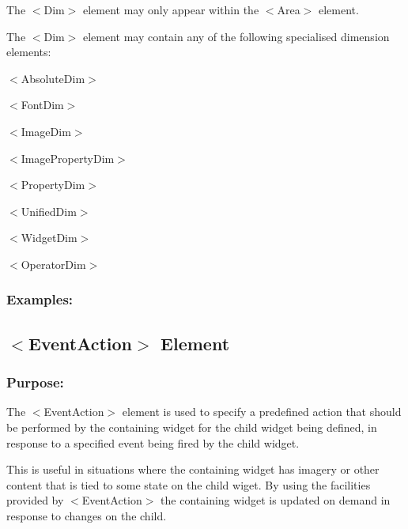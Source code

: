 \begin{DoxyItemize}
\item The {\ttfamily $<$Dim$>$} element may only appear within the {\ttfamily $<$Area$>$} element.


\item The {\ttfamily $<$Dim$>$} element may contain any of the following specialised dimension elements\+: 
\begin{DoxyItemize}
\item {\ttfamily $<$Absolute\+Dim$>$} 
\item {\ttfamily $<$Font\+Dim$>$} 
\item {\ttfamily $<$Image\+Dim$>$} 
\item {\ttfamily $<$Image\+Property\+Dim$>$} 
\item {\ttfamily $<$Property\+Dim$>$} 
\item {\ttfamily $<$Unified\+Dim$>$} 
\item {\ttfamily $<$Widget\+Dim$>$} 
\item {\ttfamily $<$Operator\+Dim$>$} 
\end{DoxyItemize}
\end{DoxyItemize}\hypertarget{fal_element_ref_fal_elem_ref_sec_9_4}{}\subsubsection{Examples\+:}\label{fal_element_ref_fal_elem_ref_sec_9_4}
\hypertarget{fal_element_ref_fal_elem_ref_eventaction}{}\subsection{$<$\+Event\+Action$>$ Element}\label{fal_element_ref_fal_elem_ref_eventaction}
\hypertarget{fal_element_ref_fal_elem_ref_eventaction_1}{}\subsubsection{Purpose\+:}\label{fal_element_ref_fal_elem_ref_eventaction_1}
The {\ttfamily $<$Event\+Action$>$} element is used to specify a predefined action that should be performed by the containing widget for the child widget being defined, in response to a specified event being fired by the child widget. \begin{DoxyParagraph}{This is useful in situations where the containing widget has imagery or}
other content that is tied to some state on the child wiget. By using the facilities provided by $<$Event\+Action$>$ the containing widget is updated on demand in response to changes on the child.
\end{DoxyParagraph}
